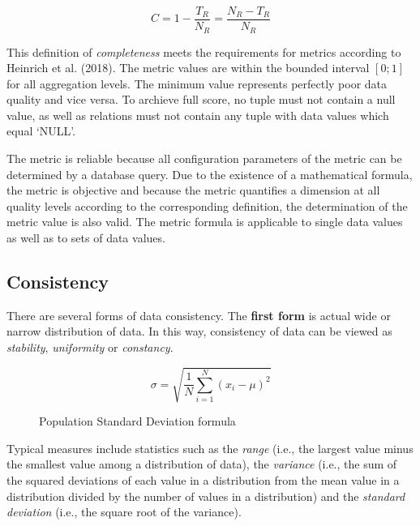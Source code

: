 \begin{equation}
    C = 1 - \frac{T_R}{N_R} = \frac{N_R - T_R}{N_R}
\end{equation}

This definition of \textit{completeness} meets the requirements for metrics according to Heinrich et al. (2018).
The metric values are within the bounded interval \( \left[0; 1\right] \) for all aggregation levels.
The minimum value represents perfectly poor data quality and vice versa.
To archieve full score, no tuple must not contain a null value, as well as relations must not contain any tuple with data values which equal \enquote*{NULL}.

The metric is reliable because all configuration parameters of the metric can be determined by a database query.
Due to the existence of a mathematical formula, the metric is objective and because the metric quantifies a dimension at all quality levels according to the corresponding definition, the determination of the metric value is also valid.
The metric formula is applicable to single data values as well as to sets of data values.

\subsection{Consistency}

There are several forms of data consistency.
The \textbf{first form} is actual wide or narrow distribution of data.
In this way, consistency of data can be viewed as \textit{stability}, \textit{uniformity} or \textit{constancy}.

\begin{figure}[htb]
    \centering
    
    \begin{equation*}
        \sigma = \sqrt{\frac{1}{N}\sum_{i=1}^{N} (x_{i} - \mu)^2}
    \end{equation*}

    \caption{Population Standard Deviation formula}
    \label{form:population-standard-dev}
\end{figure}
\FloatBarrier

Typical measures include statistics such as the \textit{range} (i.e., the largest value minus the smallest value among a distribution of data), the \textit{variance} (i.e., the sum of the squared deviations of each value in a distribution from the mean value in a distribution divided by the number of values in a distribution) and the \textit{standard deviation} (i.e., the square root of the variance).

